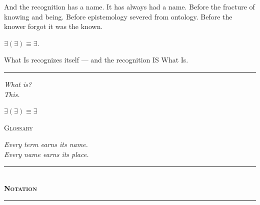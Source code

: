 \documentclass[10pt, openany, oneside]{book}
\renewcommand{\normalsize}{\fontsize{10}{13}\selectfont}
\renewcommand{\huge}{\fontsize{17}{21}\selectfont}
\begin{document}
And the recognition has a name. It has always had a name. Before the fracture of knowing and being. Before epistemology severed from ontology. Before the knower forgot it was the known.

$\exists(\exists) \equiv \exists$.

What Is recognizes itself --- and the recognition IS What Is.

\vspace{2em}

\begin{center}
    \rule{0.15\textwidth}{0.3pt}
\end{center}

\vspace{0.5em}

\begin{center}
    \itshape
    What is?\\[0.8em]
    This.
\end{center}

\vspace{1.5em}

\begin{center}
    \bfseries\itshape
    $\exists(\exists) \equiv \exists$
\end{center}

%
%
%

\newpage

\begin{center}
    {\huge\scshape Glossary}
\end{center}

\vspace{1.5em}

\begin{center}
    \itshape
    Every term earns its name.\\
    Every name earns its place.
\end{center}

\vspace{2em}


\begin{center}
    \rule{0.3\textwidth}{0.4pt}\\[0.5em]
    {\normalsize\bfseries\scshape Notation}\\[0.3em]
    \rule{0.3\textwidth}{0.4pt}
\end{center}
\end{document}
